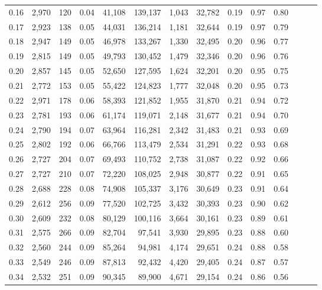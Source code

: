 \begin{tabular}{rrrrrrrrrrrrrr}
0.16 &  2,970 &  120 &  0.04 &   41,108 &  139,137 &   1,043 &  32,782 &  0.19 &  0.97 &      0.80 \\
0.17 &  2,923 &  138 &  0.05 &   44,031 &  136,214 &   1,181 &  32,644 &  0.19 &  0.97 &      0.79 \\
0.18 &  2,947 &  149 &  0.05 &   46,978 &  133,267 &   1,330 &  32,495 &  0.20 &  0.96 &      0.77 \\
0.19 &  2,815 &  149 &  0.05 &   49,793 &  130,452 &   1,479 &  32,346 &  0.20 &  0.96 &      0.76 \\
0.20 &  2,857 &  145 &  0.05 &   52,650 &  127,595 &   1,624 &  32,201 &  0.20 &  0.95 &      0.75 \\
0.21 &  2,772 &  153 &  0.05 &   55,422 &  124,823 &   1,777 &  32,048 &  0.20 &  0.95 &      0.73 \\
0.22 &  2,971 &  178 &  0.06 &   58,393 &  121,852 &   1,955 &  31,870 &  0.21 &  0.94 &      0.72 \\
0.23 &  2,781 &  193 &  0.06 &   61,174 &  119,071 &   2,148 &  31,677 &  0.21 &  0.94 &      0.70 \\
0.24 &  2,790 &  194 &  0.07 &   63,964 &  116,281 &   2,342 &  31,483 &  0.21 &  0.93 &      0.69 \\
0.25 &  2,802 &  192 &  0.06 &   66,766 &  113,479 &   2,534 &  31,291 &  0.22 &  0.93 &      0.68 \\
0.26 &  2,727 &  204 &  0.07 &   69,493 &  110,752 &   2,738 &  31,087 &  0.22 &  0.92 &      0.66 \\
0.27 &  2,727 &  210 &  0.07 &   72,220 &  108,025 &   2,948 &  30,877 &  0.22 &  0.91 &      0.65 \\
0.28 &  2,688 &  228 &  0.08 &   74,908 &  105,337 &   3,176 &  30,649 &  0.23 &  0.91 &      0.64 \\
0.29 &  2,612 &  256 &  0.09 &   77,520 &  102,725 &   3,432 &  30,393 &  0.23 &  0.90 &      0.62 \\
0.30 &  2,609 &  232 &  0.08 &   80,129 &  100,116 &   3,664 &  30,161 &  0.23 &  0.89 &      0.61 \\
0.31 &  2,575 &  266 &  0.09 &   82,704 &   97,541 &   3,930 &  29,895 &  0.23 &  0.88 &      0.60 \\
0.32 &  2,560 &  244 &  0.09 &   85,264 &   94,981 &   4,174 &  29,651 &  0.24 &  0.88 &      0.58 \\
0.33 &  2,549 &  246 &  0.09 &   87,813 &   92,432 &   4,420 &  29,405 &  0.24 &  0.87 &      0.57 \\
0.34 &  2,532 &  251 &  0.09 &   90,345 &   89,900 &   4,671 &  29,154 &  0.24 &  0.86 &      0.56 \\

\end{tabular}
